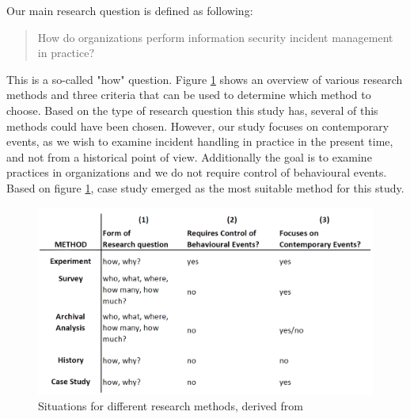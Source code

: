 Our main research question is defined as following:

\begin{quote}
How do organizations perform information security incident management in practice?
\end{quote}

This is a so-called "how" question. Figure \ref{fig:methods} shows an overview of various research methods and three criteria that can be used to determine which method to choose. Based on the type of research question this study has, several of this methods could have been chosen. However, our study focuses on contemporary events, as we wish to examine incident handling in practice in the present time, and not from a historical point of view. Additionally the goal is to examine practices in organizations and we do not require control of behavioural events. Based on figure \ref{fig:methods}, case study emerged as the most suitable method for this study.

\begin{figure}[H]
\begin{center}
\includegraphics[scale=0.35]{methods.png}
\caption[Situations for different research methods]{Situations for different research methods, derived from \cite{CaseStudyResearch}}
\label{fig:methods}
\end{center}
\end{figure}
